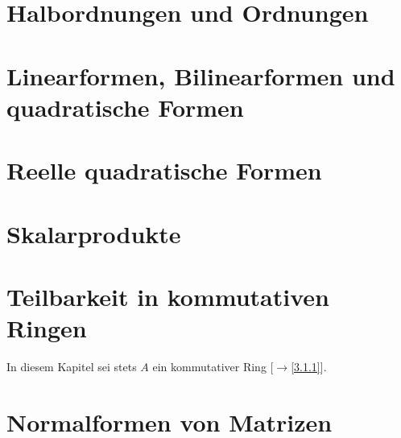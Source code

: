\documentclass[
twoside=semi, %
fontsize=12,
DIV=12, %
cleardoublepage=current,
leqno,
headings=optiontoheadandtoc, %
toc=idx %
]{scrbook}
\theoremstyle{definition}
\begin{document}
\newpage
\chapter{Halbordnungen und Ordnungen}
    

\chapter{Linearformen, Bilinearformen und quadratische Formen}
    
    
\chapter{Reelle quadratische Formen}
    
    
\chapter{Skalarprodukte}
    

\chapter{Teilbarkeit in kommutativen Ringen}
In diesem Kapitel sei stets $A$ ein kommutativer Ring [$\to$\ref{3.1.1}].
    

\chapter{Normalformen von Matrizen}
    

\backmatter
\printindex
\end{document}
